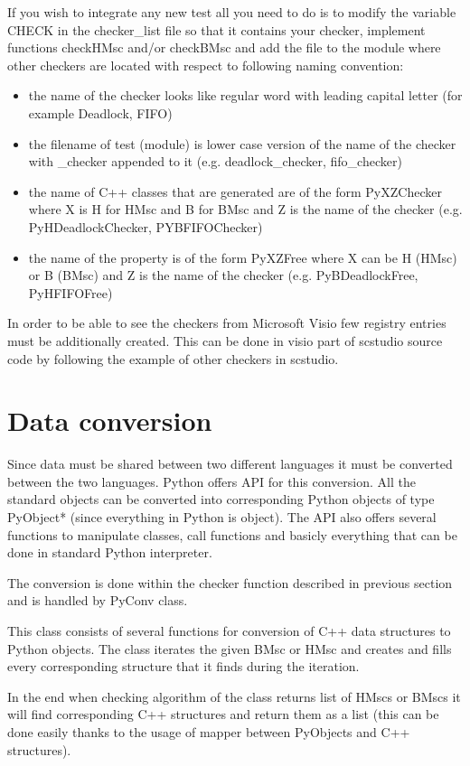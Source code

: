 \documentclass[11pt,oneside]{fithesis2}
\begin{document}
If you wish to integrate any new test all you need to do is to modify the variable CHECK in the checker\_list file so that it contains your checker, implement functions checkHMsc and/or checkBMsc and add the file to the module where other checkers are located with respect to following naming convention:
\begin{itemize}
\item{the name of the checker looks like regular word with leading capital letter (for example Deadlock, FIFO)}
\item{the filename of test (module) is lower case version of the name of the checker with \_checker appended to it (e.g. deadlock\_checker, fifo\_checker)}
\item{the name of C++ classes that are generated are of the form PyXZChecker where X is H for HMsc and B for BMsc and Z is the name of the checker (e.g. PyHDeadlockChecker, PYBFIFOChecker)}
\item{the name of the property is of the form PyXZFree where X can be H (HMsc) or B (BMsc) and Z is the name of the checker (e.g. PyBDeadlockFree, PyHFIFOFree)}
\end{itemize}

In order to be able to see the checkers from Microsoft Visio few registry entries must be additionally created. This can be done in visio part of scstudio source code by following the example of other checkers in scstudio.

\section{Data conversion}
Since data must be shared between two different languages it must be converted between the two languages. Python offers API for this conversion. All the standard objects can be converted into corresponding Python objects of type PyObject* (since everything in Python is object). The API also offers several functions to manipulate classes, call functions and basicly everything that can be done in standard Python interpreter.

The conversion is done within the checker function described in previous section and is handled by PyConv class.

This class consists of several functions for conversion of C++ data structures to Python objects. The class iterates the given BMsc or HMsc and creates and fills every corresponding structure that it finds during the iteration.

In the end when checking algorithm of the class returns list of HMscs or BMscs it will find corresponding C++ structures and return them as a list (this can be done easily thanks to the usage of mapper between PyObjects and C++ structures).
\end{document}
